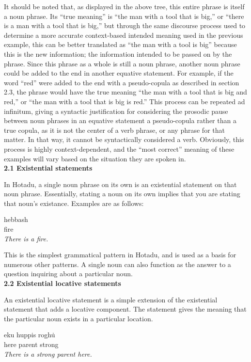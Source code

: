\documentclass{article}[10pt]
\begin{document}
It should be noted that, as displayed in the above tree, this entire phrase is itself a noun phrase. Its ``true meaning'' is ``the man with a tool that is big,'' or ``there is a man with a tool that is big,'' but through the same discourse process used to determine a more accurate context-based intended meaning used in the previous example, this can be better translated as ``the man with a tool is big'' because this is the new information; the information intended to be passed on by the phrase. Since this phrase as a whole is still a noun phrase, another noun phrase could be added to the end in another equative statement. For example, if the word ``red'' were added to the end with a pseudo-copula as described in section 2.3, the phrase would have the true meaning ``the man with a tool that is big and red,'' or ``the man with a tool that is big is red.'' This process can be repeated ad infinitum, giving a syntactic justification for considering the prosodic pause between noun phrases in an equative statement a pseudo-copula rather than a true copula, as it is not the center of a verb phrase, or any phrase for that matter. In that way, it cannot be syntactically considered a verb. Obviously, this process is highly context-dependent, and the ``most correct'' meaning of these examples will vary based on the situation they are spoken in.\\

{\bf 2.1 Existential statements}

In Hotadu, a single noun phrase on its own is an existential statement on that noun phrase. Essentially, stating a noun on its own implies that you are stating that noun's existance. Examples are as follows:
\begin{exe}
\ex 
\gll hebbash\\
fire\\
\trans \emph{There is a fire.}
\end{exe}

This is the simplest grammatical pattern in Hotadu, and is used as a basis for numerous other patterns. A single noun can also function as the answer to a question inquiring about a particular noun. \\

{\bf 2.2 Existential locative statements}

An existential locative statement is a simple extension of the existential statement that adds a locative component. The statement gives the meaning that the particular noun exists in a particular location.
\begin{exe}
\ex
\gll eku huppis rogh\.{u}\\
here parent strong\\
\trans \emph{There is a strong parent here.}
\end{exe}
\end{document}
